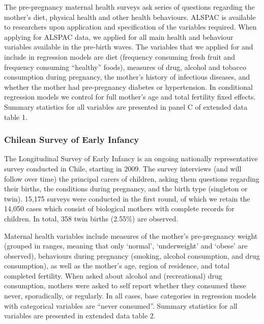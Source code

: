 \documentclass{nature}
\begin{document}
\begin{linenumbers}
The pre-pregnancy maternal health surveys ask series of questions regarding the mother's diet, physical health and other health behaviours.  ALSPAC is available to researchers upon application and specification of the variables required. When applying for ALSPAC data, we applied for all main health and behaviour variables available in the pre-birth waves.  The variables that we applied for and include in regression models are diet (frequency consuming fresh fruit and frequency consuming ``healthy'' foods), measures of drug, alcohol and tobacco consumption during pregnancy, the mother's history of infectious diseases, and whether the mother had pre-pregnancy diabetes or hypertension.  In conditional regression models we control for full mother's age and total fertility fixed effects.  Summary statistics for all variables are presented in panel C of extended data table 1.

\subsubsection{Chilean Survey of Early Infancy}
The Longitudinal Survey of Early Infancy is an ongoing nationally representative survey conducted in Chile, starting in 2009.  The survey interviews (and will follow over time) the principal carers of children, asking them questions regarding their births, the conditions during pregnancy, and the birth type (singleton or twin).  15,175 surveys were conducted in the first round, of which we retain the 14,050 cases which consist of biological mothers with complete records for children.  In total, 358 twin births (2.55\%) are observed.

Maternal health variables include measures of the mother's pre-pregnancy weight (grouped in ranges, meaning that only `normal', `underweight' and `obese' are observed), behaviours during pregnancy (smoking, alcohol consumption, and drug consumption), as well as the mother's age, region of residence, and total completed fertility.  When asked about alcohol and (recreational) drug consumption, mothers were asked to self report whether they consumed these never, sporadically, or regularly.  In all cases, base categories in regression models with categorical variables are ``never consumed''.  Summary statistics for all variables are presented in extended data table 2.


\end{linenumbers}
\end{document}
